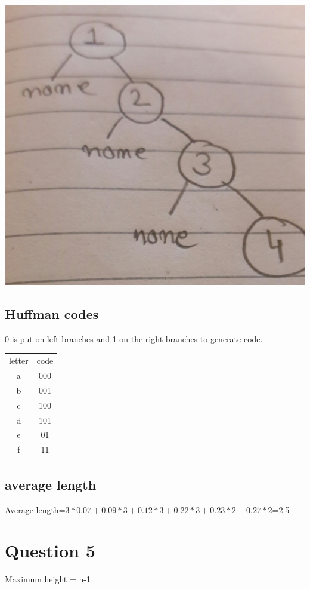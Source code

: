 \documentclass{article}
\begin{document}
\includegraphics[scale=0.05]{1.jpg}

\subsection*{Huffman codes}
0 is put on left branches and 1 on the right branches to generate code.




\begin{tabular}{c c}
\hline\hline
letter & code\\
a & 000\\
b & 001\\
c & 100\\
d & 101\\
e & 01\\
f & 11\\
\end{tabular}


\subsection*{average length}
Average length=$3*0.07+0.09*3+0.12*3+0.22*3+0.23*2+0.27*2$=2.5

\section*{Question 5}

Maximum height = n-1
\end{document}
